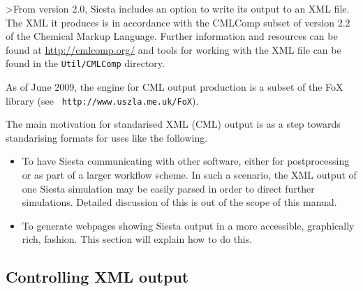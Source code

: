 \documentclass[11pt]{article}
\begin{document}
>From version 2.0, {\sc Siesta} includes an option to write its output to an
XML file. The XML it produces is in accordance with the CMLComp subset of
version 2.2 of the Chemical Markup Language. Further information
and resources can be found at \url{http://cmlcomp.org/} and tools for working
with the XML file can be found in the \texttt{Util/CMLComp} directory.

As of June 2009, the engine for CML output production is a subset of
the FoX library (see {\tt
  http://www.uszla.me.uk/FoX}).

The main motivation for standarised XML (CML) output is as a step
towards standarising formats for uses like the following.

\begin{itemize}

\item To have {\sc Siesta} communicating with other software, either
for postprocessing or as part of a larger workflow scheme. In such a
scenario, the XML output of one {\sc Siesta} simulation may be easily parsed
in order to direct further simulations. Detailed discussion of this is
out of the scope of this manual.

\item To generate webpages showing {\sc Siesta} output in a more accessible,
graphically rich, fashion. This section will explain how to do this.

\end{itemize}

\subsection{Controlling XML output}
\end{document}
